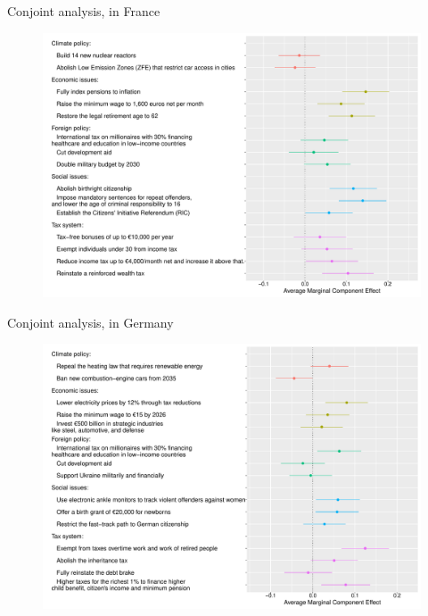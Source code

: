 \documentclass[aspectratio=169,xcolor=dvipsnames, 11pt,mathserif]{beamer}
\begin{document}
\begin{frame}{Conjoint analysis,  in France\label{conjoint_countries} \hyperlink{conjoint_country}{}} 
    \begin{figure} \vspace{-.14cm}
\includegraphics[height=.97\textheight]{../figures/all/conjoint_EN-FR.pdf}
\end{figure}
\end{frame}

\begin{frame}{Conjoint analysis,  in Germany\label{conjoint_countries} \hyperlink{conjoint_country}{}} 
    \begin{figure} \vspace{-.14cm}
\includegraphics[height=.97\textheight]{../figures/all/conjoint_EN-DE.pdf}
\end{figure}
\end{frame}
\end{document}
